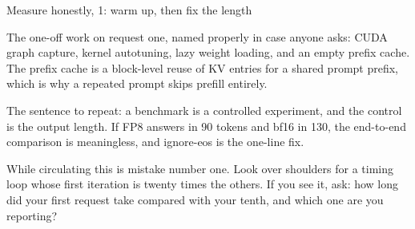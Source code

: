 \documentclass[aspectratio=169,10pt]{beamer}
\begin{document}
\begin{frame}{Measure honestly, 1: warm up, then fix the length}
{  The one-off work on request one, named properly in case anyone asks: CUDA
  graph capture, kernel autotuning, lazy weight loading, and an empty prefix
  cache. The prefix cache is a block-level reuse of KV entries for a shared
  prompt prefix, which is why a repeated prompt skips prefill entirely.

  The sentence to repeat: a benchmark is a controlled experiment, and the
  control is the output length. If FP8 answers in 90 tokens and bf16 in 130,
  the end-to-end comparison is meaningless, and ignore-eos is the one-line fix.

  While circulating this is mistake number one. Look over shoulders for a
  timing loop whose first iteration is twenty times the others. If you see it,
  ask: how long did your first request take compared with your tenth, and which
  one are you reporting?}
\end{frame}
\end{document}
